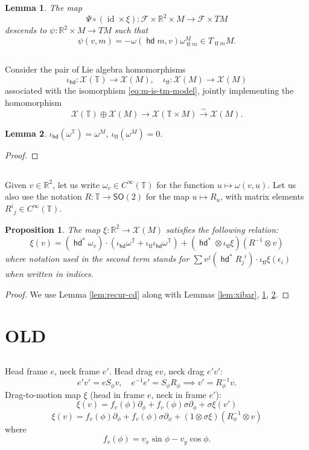 \documentclass{amsart}
\def\RR{\mathbb{R}}
\def\TT{\mathbb{T}}
\def\XX{\mathscr{X}}
\def\sF{\mathscr{F}}
\DeclareMathOperator{\id}{\mathrm{id}}
\def\SO{\mathsf{SO}}
\DeclareMathOperator{\tail}{{\mathsf{tl}}}
\DeclareMathOperator{\head}{{\mathsf{hd}}}
\newtheorem{lem}{Lemma}
\newtheorem{prop}{Proposition}
\theoremstyle{definition}
\begin{document}
\begin{lem}\label{lem:psi}
        The map $$\Psi \circ (\id\times\xi) : \sF\times\RR^2\times M \to \sF\times TM$$
        descends to
        $ \psi : \RR^2 \times M \to TM $
        such that
        $$ \psi(v,m) = -\omega(\head m,v) \omega^M_{\tail m} \in T_{\tail m}M. $$
\end{lem}


\subsection{}Consider the pair of Lie algebra homomorphisms 
$$
\iota_{\head} : \XX(\TT) \to \XX(M),\quad \iota_{\tail} : \XX(M) \to \XX(M)
$$
associated with the isomorphism \eqref{eq:m-is-tm-model}, jointly implementing
the homomorphism
$$
\XX(\TT) \oplus \XX(M) \to \XX(\TT\times M)\xrightarrow{\sim} \XX(M).
$$
\begin{lem}\label{lem:head-equiv}
        $\iota_{\head}(\omega^\TT) = \omega^M$, $\iota_{\tail}(\omega^M)=0$.
\end{lem}
\begin{proof}\end{proof}

\subsection{}
Given $v \in \RR^2$, let us write $\omega_v \in C^\infty(\TT)$
for the function $u \mapsto \omega(v,u)$.
Let us also use the notation
$R : \TT \to \SO(2)$ for the map $u\mapsto R_u$,
with matrix elements ${R^i}_{j} \in C^\infty(\TT)$.
\begin{prop}
The map $\xi : \RR^2 \to \XX(M)$ satisfies the following relation:
$$
\xi(v) = (\head^*\omega_v) \cdot \left(\iota_{\head} \omega^\TT + \iota_{\tail} \iota_{\head} \omega^\TT\right)
+ (\head^* \otimes \iota_{\tail}\xi) (R^{-1}\otimes v)
 $$
 where notation used in the second term stands for
$\sum v^j (\head^*{R_j}^i) \cdot \iota_{\tail} \xi(\epsilon_i)$
when written in indices.
\end{prop}
\begin{proof}
        We use Lemma \ref{lem:recur-cd} along with Lemmas \ref{lem:xibar}, \ref{lem:psi}, \ref{lem:head-equiv}.
\end{proof}

\newpage
\section{OLD}
\subsection{}
Head frame $e$, neck frame $e'$. Head drag $ev$, neck drag $e'v'$:
$$ e'v'= e S_\phi v,\quad e^{-1}e' = S_\phi R_\phi \implies v' = R_{\phi}^{-1}v. $$
Drag-to-motion map $\xi$ (head in frame $e$, neck in frame $e'$):
$$ \xi(v) = f_v(\phi)\partial_\phi + f_v(\phi)\sigma\partial_\phi + \sigma \xi(v') $$
$$ \xi(v) = f_v(\phi)\partial_\phi + f_v(\phi)\sigma\partial_\phi + (1\otimes\sigma\xi)(R_\phi^{-1}\otimes v) $$
where
$$ f_v(\phi) = v_x\sin\phi - v_y\cos\phi.$$
\end{document}
